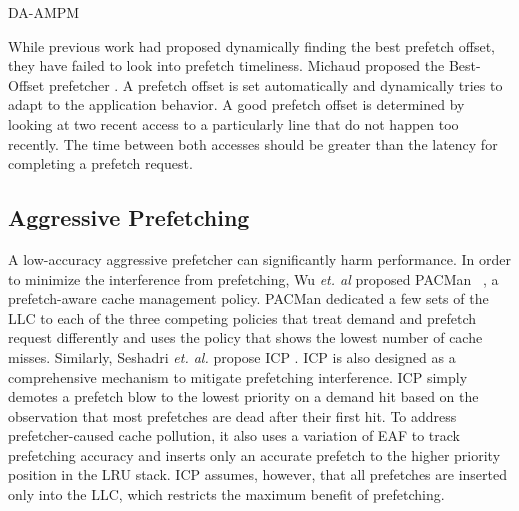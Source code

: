 DA-AMPM


While previous work had proposed dynamically finding the best prefetch offset, they have failed to look into prefetch timeliness. Michaud proposed the Best-Offset prefetcher \cite{BOP}. A prefetch offset is set automatically and dynamically tries to adapt to the application behavior. A good prefetch offset is determined by looking at two recent access to a particularly line that do not happen too recently. The time between both accesses should be greater than the latency for completing a prefetch request. 

\subsection{Aggressive Prefetching}


A low-accuracy aggressive prefetcher can significantly harm performance. In order to minimize the interference from prefetching, Wu \textit{et. al} proposed PACMan ~\cite{pacman}, a prefetch-aware cache management policy. PACMan dedicated a few sets of the LLC to each of the three competing policies that treat demand and prefetch request differently and uses the policy that shows the lowest number of cache misses. Similarly, Seshadri  \textit{et. al.} propose ICP \cite{icp}. ICP is also designed as a comprehensive mechanism to mitigate prefetching interference. ICP simply demotes a prefetch blow to the lowest priority on a demand hit based on the observation that most prefetches are dead after their first hit. To address prefetcher-caused cache pollution, it also uses a variation of EAF \cite{eaf} to track prefetching accuracy and inserts only an accurate prefetch to the higher priority position in the LRU stack. ICP assumes, however, that all prefetches are inserted only into the LLC, which restricts the maximum benefit of prefetching.
